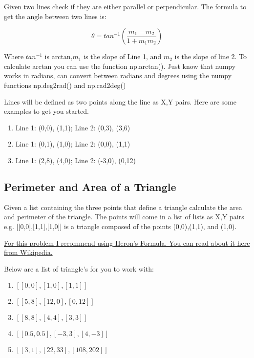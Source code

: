 \documentclass[12pt]{article}
\begin{document}
Given two lines check if they are either parallel or perpendicular. The formula to get the angle between two lines is:

\begin{equation}
    \theta = tan^{-1}(\frac{m_1 - m_2}{1 + m_1m_2})
\end{equation}

Where $tan^{-1}$ is arctan,$m_1$ is the slope of Line 1, and $m_2$ is the slope of line 2. To calculate arctan you can use the function np.arctan(). Just know that numpy works in radians, can convert between radians and degrees using the numpy functions np.deg2rad() and np.rad2deg()

Lines will be defined as two points along the line as X,Y pairs. Here are some examples to get you started.

\begin{enumerate}
    \item Line 1: (0,0), (1,1); Line 2: (0,3), (3,6)
    \item Line 1: (0,1), (1,0); Line 2: (0,0), (1,1)
    \item Line 1: (2,8), (4,0); Line 2: (-3,0), (0,12)
\end{enumerate}

\subsection{Perimeter and Area of a Triangle}

Given a list containing the three points that define a triangle calculate the area and perimeter of the triangle. The points will come in a list of lists as X,Y pairs e.g. [[0,0],[1,1],[1,0]] is a triangle composed of the points (0,0),(1,1), and (1,0).

\href{https://en.wikipedia.org/wiki/Heron%27s_formula}{For this problem I recommend using Heron's Formula. You can read about it here from Wikipedia.}

Below are a list of triangle's for you to work with:

\begin{enumerate}
    \item $[[0,0],[1,0],[1,1]]$
    \item $[[5,8],[12,0],[0,12]]$
    \item $[[8,8],[4,4],[3,3]]$
    \item $[[0.5,0.5],[-3,3],[4,-3]]$
    \item $[[3,1],[22,33],[108,202]]$
\end{enumerate}
\end{document}
